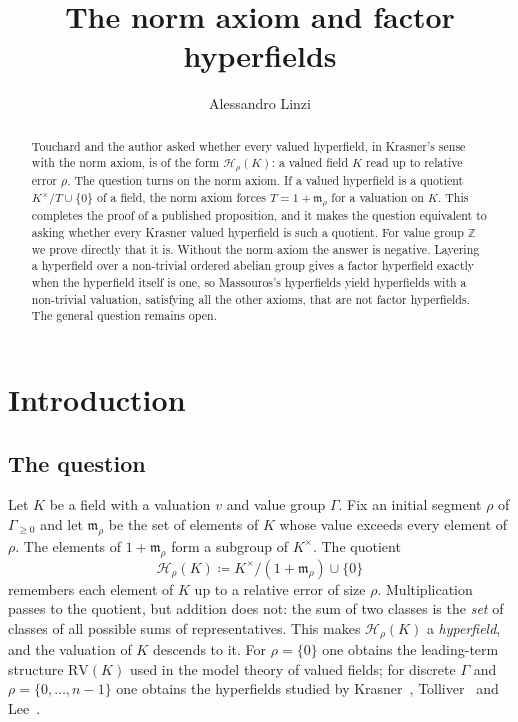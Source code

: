 \documentclass[11pt]{amsart}
\numberwithin{equation}{section}
\newcommand{\m}{\mathfrak m}
\newcommand{\Hr}{\mathcal H_\rho}
\begin{document}
\title{The norm axiom and factor hyperfields}

\author{Alessandro Linzi}
\address{Independent researcher, Udine, Italy}


\begin{abstract}
Touchard and the author asked whether every valued hyperfield, in Krasner's sense with the norm axiom, is of the form $\mathcal H_\rho(K)$: a valued field $K$ read up to relative error $\rho$. The question turns on the norm axiom. If a valued hyperfield is a quotient $K^\times/T\cup\{0\}$ of a field, the norm axiom forces $T=1+\mathfrak m_\rho$ for a valuation on $K$. This completes the proof of a published proposition, and it makes the question equivalent to asking whether every Krasner valued hyperfield is such a quotient. For value group $\mathbb Z$ we prove directly that it is. Without the norm axiom the answer is negative. Layering a hyperfield over a non-trivial ordered abelian group gives a factor hyperfield exactly when the hyperfield itself is one, so Massouros's hyperfields yield hyperfields with a non-trivial valuation, satisfying all the other axioms, that are not factor hyperfields. The general question remains open.
\end{abstract}

\maketitle

\section{Introduction}\label{sec:intro}

\subsection{The question}
Let $K$ be a field with a valuation $v$ and value group $\Gamma$. Fix an initial segment $\rho$ of $\Gamma_{\ge 0}$ and let $\m_\rho$ be the set of elements of $K$ whose value exceeds every element of $\rho$. The elements of $1+\m_\rho$ form a subgroup of $K^\times$. The quotient
\[
  \Hr(K) \coloneqq K^\times/(1+\m_\rho)\cup\{0\}
\]
remembers each element of $K$ up to a relative error of size $\rho$. Multiplication passes to the quotient, but addition does not: the sum of two classes is the \emph{set} of classes of all possible sums of representatives. This makes $\Hr(K)$ a \emph{hyperfield}, and the valuation of $K$ descends to it. For $\rho=\{0\}$ one obtains the leading-term structure $\mathrm{RV}(K)$ used in the model theory of valued fields; for discrete $\Gamma$ and $\rho=\{0,\dots,n-1\}$ one obtains the hyperfields studied by Krasner~\cite{Krasner57}, Tolliver~\cite{Tolliver16} and Lee~\cite{Lee20}.
\end{document}
